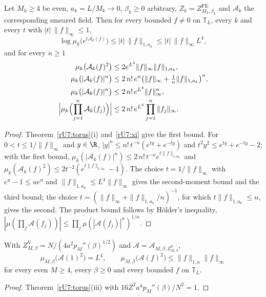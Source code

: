 \begin{corollary}\label{rU7:fe}
Let $M_k\ge4$ be even, $a_k=L/M_k\to0$, $\beta_k\ge0$ arbitrary, $Z_k=
Z^{\mathrm{FE}}_{M_k,\beta_k}$ and $\mathcal A_k$ the corresponding smeared
field. Then for every bounded $f\ne0$ on $\mathbb T_L$, every $k$ and every
$t$ with $|t|\,\|f\|_\infty\le1$,
\[
\log\mu_k\bigl(e^{t\mathcal A_k(f)}\bigr)\le|t|\,\|f\|_{1,a_k}\le|t|\,
\|f\|_\infty L^4 ,
\]
and for every $n\ge1$
\begin{align*}
\mu_k\bigl(\mathcal A_k(f)^2\bigr)&\le2e^{L^4}\|f\|_\infty\|f\|_{1,a_k},\\
\mu_k\bigl(|\mathcal A_k(f)|^n\bigr)&\le2\,n!\,e^n\bigl(\|f\|_\infty+\tfrac1n
\|f\|_{1,a_k}\bigr)^n,\\
\mu_k\bigl(|\mathcal A_k(f)|^n\bigr)&\le2\,n!\,e^{L^4}\|f\|_\infty^n,\\
\Bigl|\mu_k\Bigl(\prod_{j=1}^n\mathcal A_k(f_j)\Bigr)\Bigr|&\le2\,n!\,e^{L^4}
\prod_{j=1}^n\|f_j\|_\infty .
\end{align*}
\end{corollary}

\begin{proof}
Theorem~\ref{rU7:torus}(i) and~\eqref{rU7:xi} give the first bound. For
$0<t\le1/\|f\|_\infty$ and $y\in\R$, $|y|^n\le n!\,t^{-n}(e^{ty}+e^{-ty})$
and $t^2y^2\le e^{ty}+e^{-ty}-2$; with the first bound,
$\mu_k(|\mathcal A_k(f)|^n)\le2\,n!\,t^{-n}e^{t\|f\|_{1,a_k}}$ and
$\mu_k(\mathcal A_k(f)^2)\le2t^{-2}(e^{t\|f\|_{1,a_k}}-1)$. The choice
$t=1/\|f\|_\infty$ with $e^u-1\le ue^u$ and $\|f\|_{1,a_k}\le L^4\|f\|_\infty$
gives the second-moment bound and the third bound; the choice
$t=(\|f\|_\infty+\|f\|_{1,a_k}/n)^{-1}$, for which $t\|f\|_{1,a_k}\le n$,
gives the second. The
product bound follows by H\"older's inequality, $|\mu(\prod_j\mathcal A(f_j))|
\le\prod_j\mu(|\mathcal A(f_j)|^n)^{1/n}$.
\end{proof}

\begin{corollary}\label{rU7:var}
With $Z^{\mathrm V}_{M,\beta}=N/(4a^2p_M''(\beta)^{1/2})$ and $\mathcal A=
\mathcal A_{M,\beta,Z^{\mathrm V}_{M,\beta}}$,
\[
\mu_{M,\beta}\bigl(\mathcal A(1)^2\bigr)=L^4,\qquad
\mu_{M,\beta}\bigl(\mathcal A(f)^2\bigr)\le\|f\|_{1,a}\|f\|_\infty
\]
for every even $M\ge4$, every $\beta\ge0$ and every bounded $f$ on
$\mathbb T_L$.
\end{corollary}

\begin{proof}
Theorem~\ref{rU7:torus}(iii) with $16Z^2a^4p_M''(\beta)/N^2=1$.
\end{proof}

